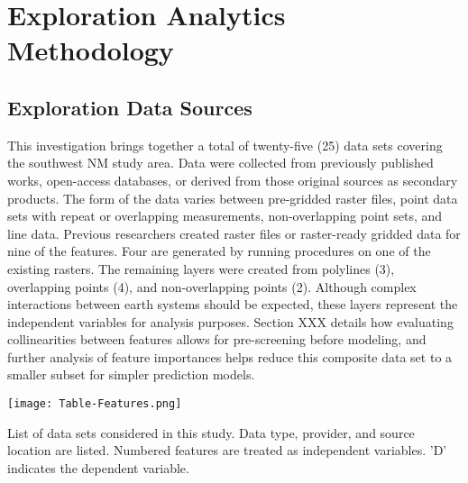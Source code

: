 \chapter{Exploration Analytics Methodology}\label{ch3:expl_methods}

\section{Exploration Data Sources}\label{ch3:expl_data_src}

This investigation brings together a total of twenty-five (25) data sets covering the southwest NM study area. Data were collected from previously published works, open-access databases, or derived from those original sources as secondary products. The form of the data varies between pre-gridded raster files, point data sets with repeat or overlapping measurements, non-overlapping point sets, and line data. Previous researchers created raster files or raster-ready gridded data for nine of the features. Four are generated by running procedures on one of the existing rasters. The remaining layers were created from polylines (3), overlapping points (4), and non-overlapping points (2). Although complex interactions between earth systems should be expected, these layers represent the independent variables for analysis purposes. Section XXX details how evaluating collinearities between features allows for pre-screening before modeling, and further analysis of feature importances helps reduce this composite data set to a smaller subset for simpler prediction models.

\begin{table}[htp]
\texttt{[image: Table-Features.png]}
\caption[Features considered in this the exploration analytics study]{List of data sets considered in this study. Data type, provider, and source location are listed. Numbered features are treated as independent variables. 'D' indicates the dependent variable.}
\label{tab:features}
\end{table}

